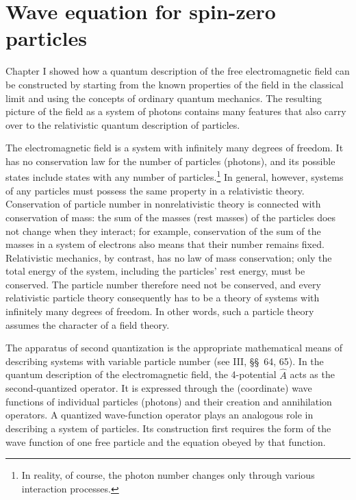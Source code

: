 
\section{Wave equation for spin-zero particles}

Chapter I showed how a quantum description of the free electromagnetic field can be constructed by starting from the known properties of the field in the classical limit and using the concepts of ordinary quantum mechanics. The resulting picture of the field as a system of photons contains many features that also carry over to the relativistic quantum description of particles.

The electromagnetic field is a system with infinitely many degrees of freedom. It has no conservation law for the number of particles (photons), and its possible states include states with any number of particles.\footnote{In reality, of course, the photon number changes only through various interaction processes.} In general, however, systems of any particles must possess the same property in a relativistic theory. Conservation of particle number in nonrelativistic theory is connected with conservation of mass: the sum of the masses (rest masses) of the particles does not change when they interact; for example, conservation of the sum of the masses in a system of electrons also means that their number remains fixed. Relativistic mechanics, by contrast, has no law of mass conservation; only the total energy of the system, including the particles' rest energy, must be conserved. The particle number therefore need not be conserved, and every relativistic particle theory consequently has to be a theory of systems with infinitely many degrees of freedom. In other words, such a particle theory assumes the character of a field theory.

The apparatus of second quantization is the appropriate mathematical means of describing systems with variable particle number (see III, \S\S~64, 65). In the quantum description of the electromagnetic field, the 4-potential $\widehat A$ acts as the second-quantized operator. It is expressed through the (coordinate) wave functions of individual particles (photons) and their creation and annihilation operators. A quantized wave-function operator plays an analogous role in describing a system of particles. Its construction first requires the form of the wave function of one free particle and the equation obeyed by that function.

